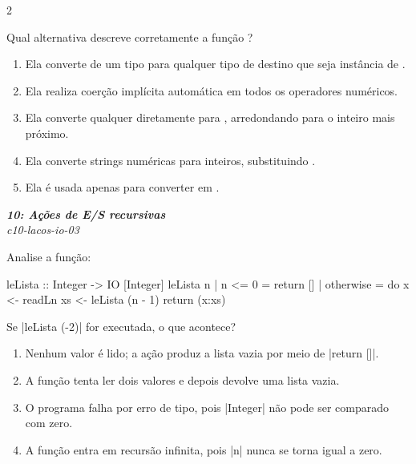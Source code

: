 \documentclass[a4paper,10pt,brazil]{article}
\begin{document}
\begin{multicols}{2}
\begin{flushright}
\end{flushright}
Qual alternativa descreve corretamente a função ?
\begin{enumerate}
  \item Ela converte de um tipo  para qualquer tipo de destino que seja instância de .
  \item Ela realiza coerção implícita automática em todos os operadores numéricos.
  \item Ela converte qualquer  diretamente para , arredondando para o inteiro mais próximo.
  \item Ela converte strings numéricas para inteiros, substituindo .
  \item Ela é usada apenas para converter  em .

\end{enumerate}

\begin{flushright}
  \footnotesize
  \textit{\textbf{10: Ações de E/S recursivas}}\\
  \textit{c10-lacos-io-03}\\

\end{flushright}
Analise a função:

\begin{haskellcode}
leLista :: Integer -> IO [Integer]
leLista n
  | n <= 0    = return []
  | otherwise = do
      x <- readLn
      xs <- leLista (n - 1)
      return (x:xs)
\end{haskellcode}

Se \haskellinline|leLista (-2)| for executada, o que acontece?

\begin{enumerate}
  \item Nenhum valor é lido; a ação produz a lista vazia por meio de \haskellinline|return []|.

  \item A função tenta ler dois valores e depois devolve uma lista vazia.

  \item O programa falha por erro de tipo, pois \haskellinline|Integer| não pode ser comparado com zero.

  \item A função entra em recursão infinita, pois \haskellinline|n| nunca se torna igual a zero.


\end{enumerate}
\end{multicols}
\end{document}

